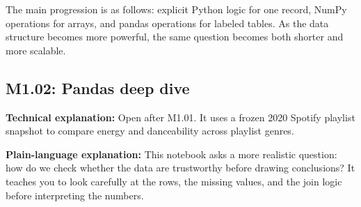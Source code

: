 \documentclass[11pt,a4paper]{article}
\begin{document}
The main progression is as follows: explicit Python logic for one record, NumPy operations for arrays, and pandas operations for labeled tables. As the data structure becomes more powerful, the same question becomes both shorter and more scalable.

\subsection{M1.02: Pandas deep dive}
\textbf{Technical explanation:} Open  after M1.01. It uses a frozen 2020 Spotify playlist snapshot to compare energy and danceability across playlist genres.

\textbf{Plain-language explanation:} This notebook asks a more realistic question: how do we check whether the data are trustworthy before drawing conclusions? It teaches you to look carefully at the rows, the missing values, and the join logic before interpreting the numbers.
\end{document}

